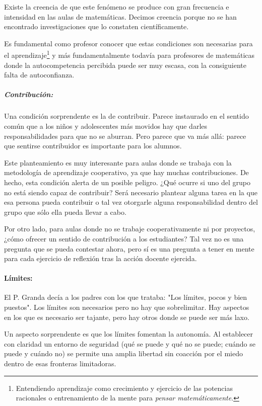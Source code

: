 Existe la creencia de que este fenómeno se produce con gran frecuencia e intensidad en las aulas de matemáticas. 
%
Decimos creencia porque no se han encontrado investigaciones que lo constaten científicamente.

Es fundamental como profesor conocer que estas condiciones son necesarias para el aprendizaje\footnote{Entendiendo aprendizaje como crecimiento y ejercicio de las potencias racionales o entrenamiento de la mente para \textit{pensar matemáticamente}.} y más fundamentalmente todavía para profesores de matemáticas donde la autocompetencia percibida puede ser muy escasa, con la consiguiente falta de autoconfianza.

\subparagraph{Contribución:} Una condición sorprendente es la de contribuir.
%
Parece instaurado en el sentido común que a los niños y adolescentes más movidos hay que darles responsabilidades para que no se aburran.
%
Pero parece que va más allá: parece que sentirse contribuidor es importante para los alumnos.

Este planteamiento es muy interesante para aulas donde se trabaja con la metodología de aprendizaje cooperativo, ya que hay muchas contribuciones.
%
De hecho, esta condición alerta de un posible peligro. 
%
¿Qué ocurre si uno del grupo no está siendo capaz de contribuir?
%
Será necesario plantear alguna tarea en la que esa persona pueda contribuir o tal vez otorgarle alguna responsabilidad dentro del grupo que sólo ella pueda llevar a cabo.

Por otro lado, para aulas donde no se trabaje cooperativamente ni por proyectos, ¿cómo ofrecer un sentido de contribución a los estudiantes?
%
Tal vez no es una pregunta que se pueda contestar ahora, pero sí es una pregunta a tener en mente para cada ejercicio de reflexión tras la acción docente ejercida.


\paragraph{Límites:} El P. Granda decía a los padres con los que trataba: "Los límites, pocos y bien puestos".
%
Los límites son necesarios pero no hay que sobrelimitar.
%
Hay aspectos en los que es necesario ser tajante, pero hay otros donde se puede ser más laxo.


Un aspecto sorprendente es que los límites fomentan la autonomía.
%
Al establecer con claridad un entorno de seguridad (qué se puede y qué no se puede; cuándo se puede y cuándo no) se permite una amplia libertad sin coacción por el miedo dentro de esas fronteras limitadoras.


